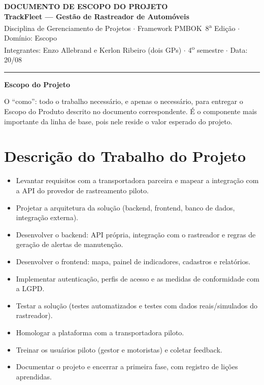 \documentclass[11pt,a4paper]{article}
\begin{document}
\begin{center}
{\Large\bfseries DOCUMENTO DE ESCOPO DO PROJETO}\\[2pt]
{\large\bfseries TrackFleet --- Gestão de Rastreador de Automóveis}\\[4pt]
Disciplina de Gerenciamento de Projetos $\cdot$ Framework PMBOK\textregistered\ 8\textsuperscript{a} Edição $\cdot$ Domínio: Escopo\\[2pt]
Integrantes: Enzo Allebrand e Kerlon Ribeiro (dois GPs) $\cdot$ 4\textsuperscript{o} semestre $\cdot$ Data: 20/08
\end{center}

\vspace{2mm}
\hrule
\vspace{4mm}

\noindent\textbf{\large Escopo do Projeto}

\vspace{1mm}
\noindent O ``como'': todo o trabalho necessário, e apenas o necessário, para entregar o Escopo do Produto descrito no documento correspondente. É o componente mais importante da linha de base, pois nele reside o valor esperado do projeto.

\section{Descrição do Trabalho do Projeto}
\begin{itemize}[itemsep=2pt]
  \item Levantar requisitos com a transportadora parceira e mapear a integração com a API do provedor de rastreamento piloto.
  \item Projetar a arquitetura da solução (backend, frontend, banco de dados, integração externa).
  \item Desenvolver o backend: API própria, integração com o rastreador e regras de geração de alertas de manutenção.
  \item Desenvolver o frontend: mapa, painel de indicadores, cadastros e relatórios.
  \item Implementar autenticação, perfis de acesso e as medidas de conformidade com a LGPD.
  \item Testar a solução (testes automatizados e testes com dados reais/simulados do rastreador).
  \item Homologar a plataforma com a transportadora piloto.
  \item Treinar os usuários piloto (gestor e motoristas) e coletar feedback.
  \item Documentar o projeto e encerrar a primeira fase, com registro de lições aprendidas.
\end{itemize}
\end{document}
